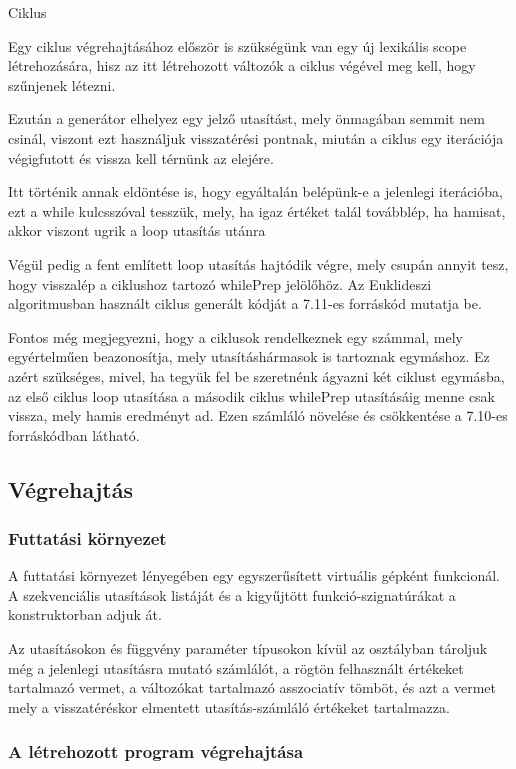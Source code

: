 Ciklus

Egy ciklus végrehajtásához először is szükségünk van egy új lexikális scope létrehozására, hisz az itt létrehozott változók a ciklus végével meg kell, hogy szűnjenek létezni.

Ezután a generátor elhelyez egy jelző utasítást, mely önmagában semmit nem csinál, viszont ezt használjuk visszatérési pontnak, miután a ciklus egy iterációja végigfutott és vissza kell térnünk az elejére.

Itt történik annak eldöntése is, hogy egyáltalán belépünk-e a jelenlegi iterációba, ezt a while kulcsszóval tesszük, mely, ha igaz értéket talál továbblép, ha hamisat, akkor viszont ugrik a loop utasítás utánra 

Végül pedig a fent említett loop utasítás hajtódik végre, mely csupán annyit tesz, hogy visszalép a ciklushoz tartozó whilePrep jelölőhöz. Az Euklideszi algoritmusban használt ciklus generált kódját a 7.11-es forráskód mutatja be.

Fontos még megjegyezni, hogy a ciklusok rendelkeznek egy számmal, mely egyértelműen beazonosítja, mely utasításhármasok is tartoznak egymáshoz. Ez azért szükséges, mivel, ha tegyük fel be szeretnénk ágyazni két ciklust egymásba, az első ciklus loop utasítása a második ciklus whilePrep utasításáig menne csak vissza, mely hamis eredményt ad. Ezen számláló növelése és csökkentése a 7.10-es forráskódban látható.

\subsection{Végrehajtás}

\subsubsection{Futtatási környezet}

A futtatási környezet lényegében egy egyszerűsített virtuális gépként funkcionál. A szekvenciális utasítások listáját és a kigyűjtött funkció-szignatúrákat a konstruktorban adjuk át.

Az utasításokon és függvény paraméter típusokon kívül az osztályban tároljuk még a jelenlegi utasításra mutató számlálót, a rögtön felhasznált értékeket tartalmazó vermet, a változókat tartalmazó asszociatív tömböt, és azt a vermet mely a visszatéréskor elmentett utasítás-számláló értékeket tartalmazza.

\subsubsection{A létrehozott program végrehajtása}


